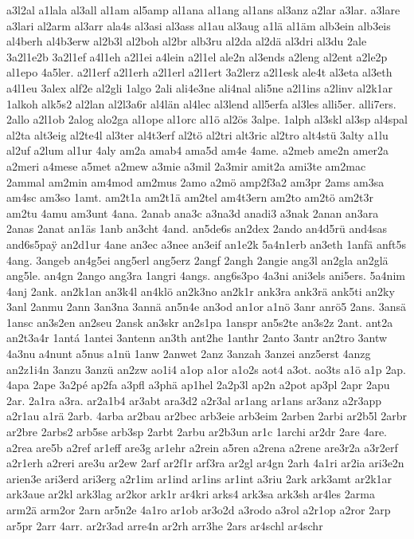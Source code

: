{a3l2al
a1lala
al3all
al1am
al5amp
al1ana
al1ang
al1ans
al3anz
a2lar
a3lar.
a3lare
a3lari
al2arm
al3arr
ala4s
al3asi
al3ass
al1au
al3aug
a1lä
al1äm
alb3ein
alb3eis
al4berh
al4b3erw
al2b3l
al2boh
al2br
alb3ru
al2da
al2dä
al3dri
al3du
2ale
3a2l1e2b
3a2l1ef
a4l1eh
a2l1ei
a4lein
a2l1el
ale2n
al3ends
a2leng
al2ent
a2le2p
al1epo
4a5ler.
a2l1erf
a2l1erh
a2l1erl
a2l1ert
3a2lerz
a2l1esk
ale4t
al3eta
al3eth
a4l1eu
3alex
alf2e
al2gli
1algo
2ali
ali4e3ne
ali4nal
ali5ne
a2l1ins
a2linv
al2k1ar
1alkoh
alk5s2
al2lan
al2l3a6r
al4län
al4lec
al3lend
all5erfa
al3les
alli5er.
alli7ers.
2allo
a2l1ob
2alog
alo2ga
al1ope
al1orc
al1ö
al2ös
3alpe.
1alph
al3skl
al3sp
al4spal
al2ta
alt3eig
al2te4l
al3ter
al4t3erf
al2tö
al2tri
alt3ric
al2tro
alt4stü
3alty
a1lu
al2uf
a2lum
al1ur
4aly
am2a
amab4
ama5d
am4e
4ame.
a2meb
ame2n
amer2a
a2meri
a4mese
a5met
a2mew
a3mie
a3mil
2a3mir
amit2a
ami3te
am2mac
2ammal
am2min
am4mod
am2mus
2amo
a2mö
amp2f3a2
am3pr
2ams
am3sa
am4sc
am3so
1amt.
am2t1a
am2t1ä
am2tel
am4t3ern
am2to
am2tö
am2t3r
am2tu
4amu
am3unt
4ana.
2anab
ana3c
a3na3d
anadi3
a3nak
2anan
an3ara
2anas
2anat
an1äs
1anb
an3cht
4and.
an5de6s
an2dex
2ando
an4d5rü
and4sas
and6s5pa^^ff
an2d1ur
4ane
an3ec
a3nee
an3eif
an1e2k
5a4n1erb
an3eth
1anfä
anft5s
4ang.
3angeb
an4g5ei
ang5erl
ang5erz
2angf
2angh
2angie
ang3l
an2gla
an2glä
ang5le.
an4gn
2ango
ang3ra
1angri
4angs.
ang6s3po
4a3ni
ani3els
ani5ers.
5a4nim
4anj
2ank.
an2k1an
an3k4l
an4klö
an2k3no
an2k1r
ank3ra
ank3rä
ank5ti
an2ky
3anl
2anmu
2ann
3an3na
3annä
an5n4e
an3od
an1or
a1nö
3anr
anrö5
2ans.
3ansä
1ansc
an3s2en
an2seu
2ansk
an3skr
an2s1pa
1anspr
an5s2te
an3s2z
2ant.
ant2a
an2t3a4r
1antá
1antei
3antenn
an3th
ant2he
1anthr
2anto
3antr
an2tro
3antw
4a3nu
a4nunt
a5nus
a1nü
1anw
2anwet
2anz
3anzah
3anzei
anz5erst
4anzg
an2z1i4n
3anzu
3anzü
an2zw
ao1i4
a1op
a1or
a1o2s
aot4
a3ot.
ao3ts
a1ö
a1p
2ap.
4apa
2ape
3a2pé
ap2fa
a3pfl
a3phä
ap1hel
2a2p3l
ap2n
a2pot
ap3pl
2apr
2apu
2ar.
2a1ra
a3ra.
ar2a1b4
ar3abt
ara3d2
a2r3al
ar1ang
ar1ans
ar3anz
a2r3app
a2r1au
a1rä
2arb.
4arba
ar2bau
ar2bec
arb3eie
arb3eim
2arben
2arbi
ar2b5l
2arbr
ar2bre
2arbs2
arb5se
arb3sp
2arbt
2arbu
ar2b3un
ar1c
1archi
ar2dr
2are
4are.
a2rea
are5b
a2ref
ar1eff
are3g
ar1ehr
a2rein
a5ren
a2rena
a2rene
are3r2a
a3r2erf
a2r1erh
a2reri
are3u
ar2ew
2arf
ar2f1r
arf3ra
ar2gl
ar4gn
2arh
4a1ri
ar2ia
ari3e2n
arien3e
ari3erd
ari3erg
a2r1im
ar1ind
ar1ins
ar1int
a3riu
2ark
ark3amt
ar2k1ar
ark3aue
ar2kl
ark3lag
ar2kor
ark1r
ar4kri
arks4
ark3sa
ark3sh
ar4les
2arma
arm2ä
arm2or
2arn
ar5n2e
4a1ro
ar1ob
ar3o2d
a3rodo
a3rol
a2r1op
a2ror
2arp
ar5pr
2arr
4arr.
ar2r3ad
arre4n
ar2rh
arr3he
2ars
ar4schl
ar4schr
}
